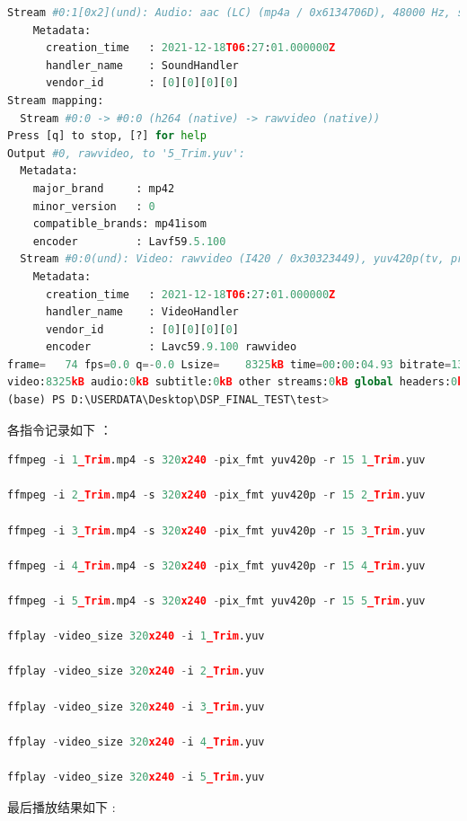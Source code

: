 \documentclass[10pt,UTF8]{ctexart}
\begin{document}
\begin{lstlisting}[language={python}]
  Stream #0:1[0x2](und): Audio: aac (LC) (mp4a / 0x6134706D), 48000 Hz, stereo, fltp, 179 kb/s (default)
    Metadata:
      creation_time   : 2021-12-18T06:27:01.000000Z
      handler_name    : SoundHandler
      vendor_id       : [0][0][0][0]
Stream mapping:
  Stream #0:0 -> #0:0 (h264 (native) -> rawvideo (native))
Press [q] to stop, [?] for help
Output #0, rawvideo, to '5_Trim.yuv':
  Metadata:
    major_brand     : mp42
    minor_version   : 0
    compatible_brands: mp41isom
    encoder         : Lavf59.5.100
  Stream #0:0(und): Video: rawvideo (I420 / 0x30323449), yuv420p(tv, progressive), 320x240 [SAR 4:3 DAR 16:9], q=2-31, 13824 kb/s, 15 fps, 15 tbn (default)
    Metadata:
      creation_time   : 2021-12-18T06:27:01.000000Z
      handler_name    : VideoHandler
      vendor_id       : [0][0][0][0]
      encoder         : Lavc59.9.100 rawvideo
frame=   74 fps=0.0 q=-0.0 Lsize=    8325kB time=00:00:04.93 bitrate=13824.0kbits/s dup=1 drop=70 speed=8.97x
video:8325kB audio:0kB subtitle:0kB other streams:0kB global headers:0kB muxing overhead: 0.000000%
(base) PS D:\USERDATA\Desktop\DSP_FINAL_TEST\test>
\end{lstlisting}

各指令记录如下 ：

\begin{lstlisting}[language={python}]
ffmpeg -i 1_Trim.mp4 -s 320x240 -pix_fmt yuv420p -r 15 1_Trim.yuv

ffmpeg -i 2_Trim.mp4 -s 320x240 -pix_fmt yuv420p -r 15 2_Trim.yuv

ffmpeg -i 3_Trim.mp4 -s 320x240 -pix_fmt yuv420p -r 15 3_Trim.yuv

ffmpeg -i 4_Trim.mp4 -s 320x240 -pix_fmt yuv420p -r 15 4_Trim.yuv

ffmpeg -i 5_Trim.mp4 -s 320x240 -pix_fmt yuv420p -r 15 5_Trim.yuv

ffplay -video_size 320x240 -i 1_Trim.yuv

ffplay -video_size 320x240 -i 2_Trim.yuv

ffplay -video_size 320x240 -i 3_Trim.yuv

ffplay -video_size 320x240 -i 4_Trim.yuv

ffplay -video_size 320x240 -i 5_Trim.yuv
\end{lstlisting}

最后播放结果如下 :
\end{document}
